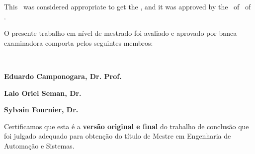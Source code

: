 


\begin{folhadeaprovacao}

    \begin{center}
        {\imprimirautor}

        \begin{center}
            \ABNTEXchapterfont\bfseries\MakeUppercase{\imprimirtitulo}\ifnotempty{\imprimirsubtitulo}{: \imprimirsubtitulo}
        \end{center}

        \begin{minipage}{\textwidth}
            \lang
            {
                This \imprimirtipotrabalho~was considered appropriate to get the \imprimirformacao,
                and it was approved by the \imprimirprograma~of \imprimircentro~of \imprimirinstituicao.
            }
            {
              \begin{center}
                O presente trabalho em nível de mestrado foi avaliado e
                aprovado por banca examinadora comporta pelos seguintes 
                membros: 
              \end{center}
            }
         \end{minipage}%
    \end{center}

    \begin{center}
   
      \textbf{\imprimirorientador}\\
      \imprimirinstituicao
      \vspace{1.5em}

      \textbf{Eduardo Camponogara, Dr. Prof.}\\
      \imprimirinstituicao 
      \vspace{1.5em}

      \textbf{Laio Oriel Seman, Dr.}\\
      \imprimirinstituicao
      \vspace{1.5em}

      \textbf{Sylvain Fournier, Dr.}\\
      \vspace{1.5em}

    \end{center}

    Certificamos que esta é a \textbf{versão original e final} do trabalho de 
    conclusão que foi julgado adequado para obtenção do título de Mestre 
    em Engenharia de Automação e Sistemas.


\end{folhadeaprovacao}
